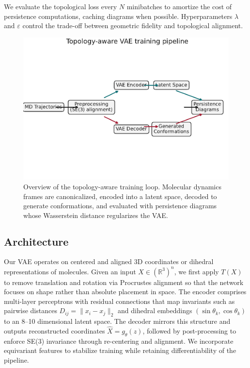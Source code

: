 \documentclass[11pt]{article}
\begin{document}
We evaluate the topological loss every $N$ minibatches to amortize the cost of persistence computations, caching diagrams when possible. Hyperparameters $\lambda$ and $\varepsilon$ control the trade-off between geometric fidelity and topological alignment.

\begin{figure}[t]
    \centering
    \includegraphics[width=0.95\linewidth]{figures/training_pipeline_overview.pdf}
    \caption{Overview of the topology-aware training loop. Molecular dynamics frames are canonicalized, encoded into a latent space, decoded to generate conformations, and evaluated with persistence diagrams whose Wasserstein distance regularizes the VAE.}
    \label{fig:training_pipeline}
\end{figure}

\subsection{Architecture}
Our VAE operates on centered and aligned 3D coordinates or dihedral representations of molecules. Given an input $X \in (\mathbb{R}^3)^n$, we first apply $T(X)$ to remove translation and rotation via Procrustes alignment so that the network focuses on shape rather than absolute placement in space. The encoder comprises multi-layer perceptrons with residual connections that map invariants such as pairwise distances $D_{ij} = \|x_i - x_j\|_2$ and dihedral embeddings $(\sin \theta_k, \cos \theta_k)$ to an 8--10 dimensional latent space. The decoder mirrors this structure and outputs reconstructed coordinates $\hat{X} = g_\theta(z)$, followed by post-processing to enforce SE(3) invariance through re-centering and alignment. We incorporate equivariant features to stabilize training while retaining differentiability of the pipeline.
\end{document}

